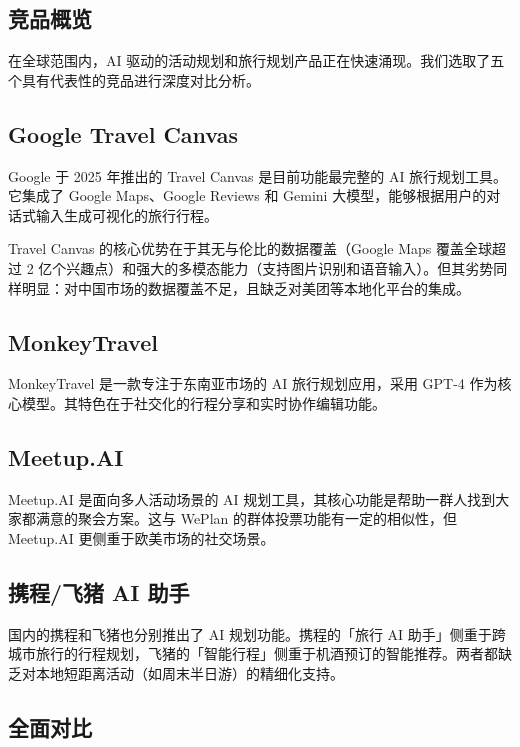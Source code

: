 \documentclass[12pt,a4paper]{ctexart}
\begin{document}
\subsection{竞品概览}

在全球范围内，AI 驱动的活动规划和旅行规划产品正在快速涌现。我们选取了五个具有代表性的竞品进行深度对比分析。

\subsection{Google Travel Canvas}

Google 于 2025 年推出的 Travel Canvas 是目前功能最完整的 AI 旅行规划工具。它集成了 Google Maps、Google Reviews 和 Gemini 大模型，能够根据用户的对话式输入生成可视化的旅行行程。

Travel Canvas 的核心优势在于其无与伦比的数据覆盖（Google Maps 覆盖全球超过 2 亿个兴趣点）和强大的多模态能力（支持图片识别和语音输入）。但其劣势同样明显：对中国市场的数据覆盖不足，且缺乏对美团等本地化平台的集成。

\subsection{MonkeyTravel}

MonkeyTravel 是一款专注于东南亚市场的 AI 旅行规划应用，采用 GPT-4 作为核心模型。其特色在于社交化的行程分享和实时协作编辑功能。

\subsection{Meetup.AI}

Meetup.AI 是面向多人活动场景的 AI 规划工具，其核心功能是帮助一群人找到大家都满意的聚会方案。这与 WePlan 的群体投票功能有一定的相似性，但 Meetup.AI 更侧重于欧美市场的社交场景。

\subsection{携程/飞猪 AI 助手}

国内的携程和飞猪也分别推出了 AI 规划功能。携程的「旅行 AI 助手」侧重于跨城市旅行的行程规划，飞猪的「智能行程」侧重于机酒预订的智能推荐。两者都缺乏对本地短距离活动（如周末半日游）的精细化支持。

\subsection{全面对比}
\end{document}
